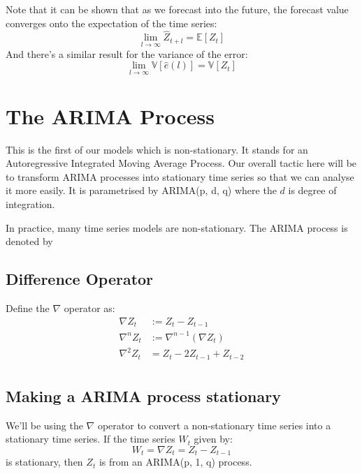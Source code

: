 Note that it can be shown that as we forecast into the future, the forecast
value converges onto the expectation of the time series:
\begin{equation*}
    \lim_{l \to \infty} \hat{Z}_{t+l} = \mathbb{E}\left[Z_{t}\right] 
\end{equation*}
And there's a similar result for the variance of the error:
\begin{equation*}
    \lim_{l \to \infty} \mathbb{V}\left[ \hat{e}(l)\right] = \mathbb{V}\left[ Z_{t} \right] 
\end{equation*}


\section{The ARIMA Process}
This is the first of our models which is non-stationary. It stands for an
Autoregressive Integrated Moving Average Process. Our overall tactic here will
be to transform ARIMA processes into stationary time series so that we can
analyse it more easily. It is parametrised by ARIMA(p, d, q) where the $d$ is
degree of integration.

In practice, many time series models are non-stationary. The ARIMA process is
denoted by
\subsection{Difference Operator}
Define the $\nabla$ operator as:
\begin{equation*}
    \begin{aligned}
        \nabla Z_{t} &:= Z_{t} - Z_{t-1}\\
        \nabla^{n} Z_{t} &:= \nabla^{n-1}\left(\nabla Z_{t}\right)\\
        \nabla^{2} Z_{t} &= Z_{t} - 2Z_{t-1} + Z_{t-2} \\
    \end{aligned}
\end{equation*}
\subsection{Making a ARIMA process stationary}
We'll be using the $\nabla $ operator to convert a non-stationary time series
into a stationary time series.
If the time series $W_{t}$ given by:
\begin{equation*}
    W_{t} = \nabla Z_{t} = Z_{t} - Z_{t-1}
\end{equation*}
is stationary, then $Z_{t}$ is from an ARIMA(p, 1, q) process.

